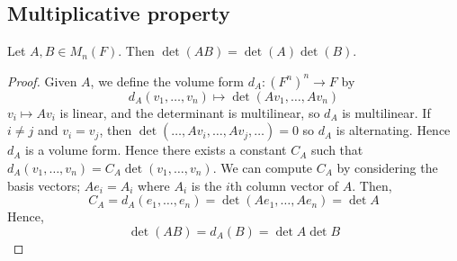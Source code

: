 \subsection{Multiplicative property}
\begin{lemma}
	Let \( A, B \in M_n(F) \).
	Then \( \det(AB) = \det(A) \det(B) \).
\end{lemma}
\begin{proof}
	Given \( A \), we define the volume form \( d_A \colon (F^n)^n \to F \) by
	\[
		d_A(v_1, \dots, v_n) \mapsto \det(A v_1, \dots, A v_n)
	\]
	\( v_i \mapsto A v_i \) is linear, and the determinant is multilinear, so \( d_A \) is multilinear.
	If \( i \neq j \) and \( v_i = v_j \), then \( \det(\dots, A v_i, \dots, A v_j, \dots) = 0 \) so \( d_A \) is alternating.
	Hence \( d_A \) is a volume form.
	Hence there exists a constant \( C_A \) such that \( d_A(v_1, \dots, v_n) = C_A \det(v_1, \dots, v_n) \).
	We can compute \( C_A \) by considering the basis vectors; \( A e_i = A_i \) where \( A_i \) is the \( i \)th column vector of \( A \).
	Then,
	\[
		C_A = d_A(e_1, \dots, e_n) = \det(Ae_1, \dots, Ae_n) = \det A
	\]
	Hence,
	\[
		\det(AB) = d_A(B) = \det A \det B
	\]
\end{proof}


